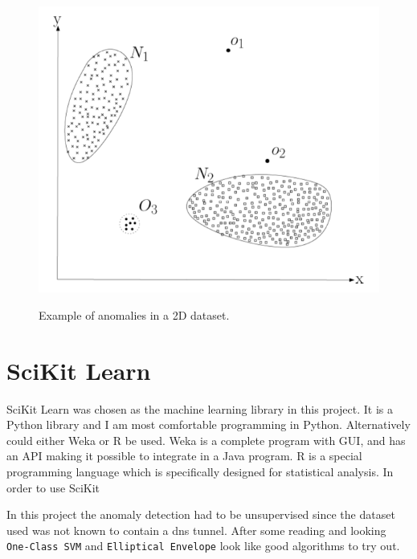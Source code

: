 \begin{figure}
\centering
\includegraphics[scale=0.3]{figs/anomaly_example.png}
\label{fig:anomalyExample}
\caption{Example of anomalies in a 2D dataset\citep{chandola2009anomaly}.}
\end{figure}



\section{SciKit Learn}
SciKit Learn was chosen as the machine learning library in this project. It is a Python library and I am most comfortable programming in Python. Alternatively could either Weka or R be used. Weka is a complete program with GUI, and has an API making it possible to integrate in a Java program. R is a special programming language which is specifically designed for statistical analysis. In order to use SciKit


In this project the anomaly detection had to be unsupervised since the dataset used was not known to contain a \gls{dns} tunnel. After some reading and looking \texttt{One-Class SVM} and \texttt{Elliptical Envelope} look like good algorithms to try out. 